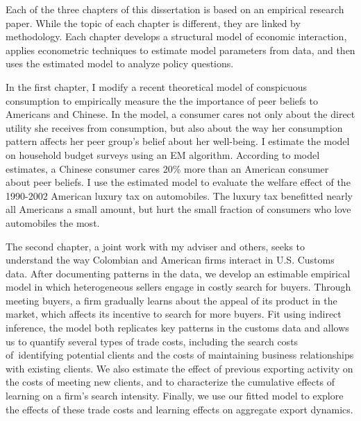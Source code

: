 
Each of the three chapters of this dissertation is based on an empirical research paper.  While the topic of each chapter is different, they are linked by methodology.  Each chapter develops a structural model of economic interaction, applies econometric techniques to estimate model parameters from data, and then uses the estimated model to analyze policy questions.

In the first chapter, I modify a recent theoretical model of conspicuous consumption to empirically measure the the importance of peer beliefs to Americans and Chinese.  In the model, a consumer cares not only about the direct utility she receives from consumption, but also about the way her consumption pattern affects her peer group's belief about her well-being.  I estimate the model on household budget surveys using an EM algorithm. According to model estimates, a Chinese consumer cares 20\% more than an American consumer about peer beliefs.  I use the estimated model to evaluate the welfare effect of the 1990-2002 American luxury tax on automobiles.  The luxury tax benefitted nearly all Americans a small amount, but hurt the small fraction of consumers who love automobiles the most.

The second chapter, a joint work with my adviser and others, seeks to understand the way Colombian and American firms interact in U.S. Customs data.  After documenting patterns in the data, we develop an estimable empirical model in which heterogeneous sellers engage in costly search for buyers.  Through meeting buyers, a firm gradually learns about the appeal of its product in the market, which affects its incentive to search for more buyers.  Fit using indirect inference, the model both replicates key patterns in the customs data and allows us to quantify several types of trade costs, including the search costs of\ identifying potential clients and the costs of maintaining business relationships with existing clients. We also estimate the effect of previous exporting activity on the costs of meeting new clients, and to characterize the cumulative effects of learning on a firm's search intensity. Finally, we use our fitted model to explore the effects of these trade costs and learning effects on aggregate export dynamics.


